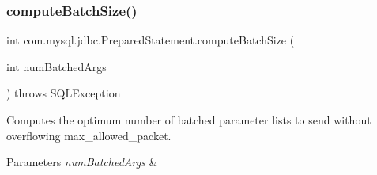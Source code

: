 \mbox{\label{classcom_1_1mysql_1_1jdbc_1_1_prepared_statement_a2de0ab2631bf812f061ea336302f2b62}} 
\subsubsection{\texorpdfstring{compute\+Batch\+Size()}{computeBatchSize()}}
{\footnotesize\ttfamily int com.\+mysql.\+jdbc.\+Prepared\+Statement.\+compute\+Batch\+Size (\begin{DoxyParamCaption}\item[{int}]{num\+Batched\+Args }\end{DoxyParamCaption}) throws S\+Q\+L\+Exception\hspace{0.3cm}{\ttfamily [protected]}}

Computes the optimum number of batched parameter lists to send without overflowing max\+\_\+allowed\+\_\+packet.


\begin{DoxyParams}{Parameters}
{\em num\+Batched\+Args} & \\
\hline
\end{DoxyParams}

